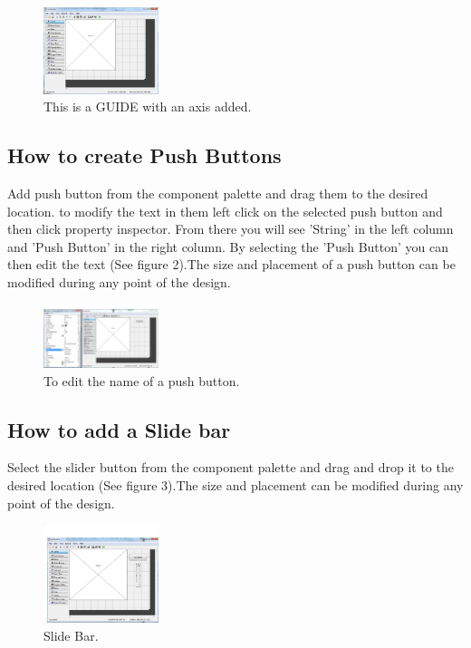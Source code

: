\documentclass[a4paper]{article}
\begin{document}
\begin{figure}
\centering
\includegraphics[width=0.3\textwidth]{Capture.PNG}
\caption{\label{fig:GUI}This is a GUIDE with an axis added.}
\end{figure}

\subsection{How to create Push Buttons}

Add push button from the component palette and drag them to the desired location. to modify the text in them left click on the selected push button and then click property inspector. From there you will see 'String' in the left column and 'Push Button' in the right column. By selecting the 'Push Button' you can then edit the text (See figure 2).The size and placement of a push button can be modified during any point of the design.

\begin{figure}
\centering
\includegraphics[width=0.3\textwidth]{Capture1.PNG}
\caption{\label{fig:Push Button}To edit the name of a push button.}
\end{figure}

\subsection{How to add a Slide bar}
Select the slider button from the component palette and drag and drop it to the desired location (See figure 3).The size and placement can be modified during any point of the design.

\begin{figure}
\centering
\includegraphics[width=0.3\textwidth]{Capture2.PNG}
\caption{\label{fig:Slide Bar}Slide Bar.}
\end{figure}
\end{document}

